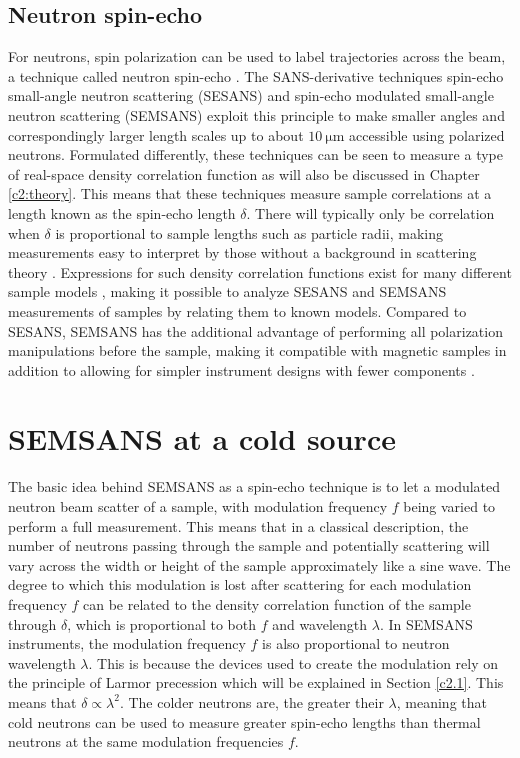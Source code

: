 \subsection{Neutron spin-echo}
For neutrons, spin polarization can be used to label trajectories across the beam, a technique called neutron spin-echo \cite{mezei1972}. The SANS-derivative techniques spin-echo small-angle neutron scattering (SESANS) \cite{rekveldt1996} and spin-echo modulated small-angle neutron scattering (SEMSANS) \cite{bouwman2009}\cite{bouwman2011} exploit this principle to make smaller angles and correspondingly larger length scales up to about $\SI{10}{\micro\meter}$ accessible using polarized neutrons. Formulated differently, these techniques can be seen to measure a type of real-space density correlation function \cite{krouglov2003} as will also be discussed in Chapter \ref{c2:theory}. This means that these techniques measure sample correlations at a length known as the spin-echo length $\delta$. There will typically only be correlation when $\delta$ is proportional to sample lengths such as particle radii, making measurements easy to interpret by those without a background in scattering theory \cite{bouwman2021}. Expressions for such density correlation functions exist for many different sample models \cite{andersson2008}, making it possible to analyze SESANS and SEMSANS measurements of samples by relating them to known models. Compared to SESANS, SEMSANS has the additional advantage of performing all polarization manipulations before the sample, making it compatible with magnetic samples \cite{li2021} in addition to allowing for simpler instrument designs with fewer components \cite{bouwman2009}.

\section{SEMSANS at a cold source}
\label{c1.2}

The basic idea behind SEMSANS as a spin-echo technique is to let a modulated neutron beam scatter of a sample, with modulation frequency $f$ being varied to perform a full measurement. This means that in a classical description, the number of neutrons passing through the sample and potentially scattering will vary across the width or height of the sample approximately like a sine wave. The degree to which this modulation is lost after scattering for each modulation frequency $f$ can be related to the density correlation function of the sample through $\delta$, which is proportional to both $f$ and wavelength $\lambda$. In SEMSANS instruments, the modulation frequency $f$ is also proportional to neutron wavelength $\lambda$. This is because the devices used to create the modulation rely on the principle of Larmor precession which will be explained in Section \ref{c2.1}. This means that $\delta\propto\lambda^2$. The colder neutrons are, the greater their $\lambda$, meaning that cold neutrons can be used to measure greater spin-echo lengths than thermal neutrons at the same modulation frequencies $f$. 

